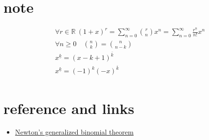 \documentclass{article}
\begin{document}
\section*{note}
\[
	\begin{aligned}
		 & \forall r\in\mathbb{R}\ {(1+x)}^r=\sum_{n=0}^\infty \binom{r}{n}x^n=\sum_{n=0}^\infty \frac{r^{\underline{n}}}{n!}x^n \\
		 & \forall n\geq 0\quad \binom{n}{k}=\binom{n}{n-k}                                                                      \\
		 & x^{\underline{k}}={(x-k+1)}^{\overline{k}}                                                                            \\
		 & x^{\underline{k}}={(-1)}^k{(-x)}^{\overline{k}}                                                                       \\
	\end{aligned}
\]

\section*{reference and links}
\begin{itemize}
	\item \href{https://en.wikipedia.org/wiki/Binomial_theorem#Newton's_generalized_binomial_theorem}{Newton's generalized binomial theorem}
\end{itemize}
\end{document}
